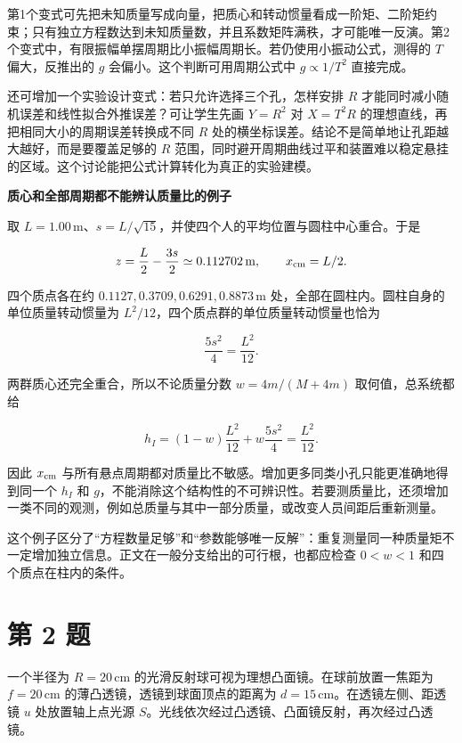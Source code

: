 \documentclass[12pt,a4paper,UTF8]{ctexart}
\begin{document}
第1个变式可先把未知质量写成向量，把质心和转动惯量看成一阶矩、二阶矩约束；只有独立方程数达到未知质量数，并且系数矩阵满秩，才可能唯一反演。第2个变式中，有限振幅单摆周期比小振幅周期长。若仍使用小振动公式，测得的
\(T\) 偏大，反推出的 \(g\) 会偏小。这个判断可用周期公式中
\(g\propto1/T^2\) 直接完成。

还可增加一个实验设计变式：若只允许选择三个孔，怎样安排 \(R\)
才能同时减小随机误差和线性拟合外推误差？可让学生先画 \(Y=R^2\) 对
\(X=T^2R\) 的理想直线，再把相同大小的周期误差转换成不同 \(R\)
处的横坐标误差。结论不是简单地让孔距越大越好，而是要覆盖足够的 \(R\)
范围，同时避开周期曲线过平和装置难以稳定悬挂的区域。这个讨论能把公式计算转化为真正的实验建模。

\textbf{质心和全部周期都不能辨认质量比的例子}

取
\(L=1.00\,\mathrm m\)、\(s=L/\sqrt{15}\)，并使四个人的平均位置与圆柱中心重合。于是

\[z=\frac L2-\frac{3s}{2}\simeq0.112702\,\mathrm m,\qquad x_{\rm cm}=L/2.\]

四个质点各在约 \(0.1127,0.3709,0.6291,0.8873\,\mathrm m\)
处，全部在圆柱内。圆柱自身的单位质量转动惯量为
\(L^2/12\)，四个质点群的单位质量转动惯量也恰为

\[\frac{5s^2}{4}=\frac{L^2}{12}.\]

两群质心还完全重合，所以不论质量分数 \(w=4m/(M+4m)\) 取何值，总系统都给

\[h_I=(1-w)\frac{L^2}{12}+w\frac{5s^2}{4}=\frac{L^2}{12}.\]

因此 \(x_{\rm cm}\)
与所有悬点周期都对质量比不敏感。增加更多同类小孔只能更准确地得到同一个
\(h_I\) 和
\(g\)，不能消除这个结构性的不可辨识性。若要测质量比，还须增加一类不同的观测，例如总质量与其中一部分质量，或改变人员间距后重新测量。

这个例子区分了``方程数量足够''和``参数能够唯一反解''：重复测量同一种质量矩不一定增加独立信息。正文在一般分支给出的可行根，也都应检查
\(0<w<1\) 和四个质点在柱内的条件。

\newpage

\section{第 2 题}\label{ux7b2c-2-ux9898}

一个半径为 \(R=20\,\mathrm{cm}\)
的光滑反射球可视为理想凸面镜。在球前放置一焦距为 \(f=20\,\mathrm{cm}\)
的薄凸透镜，透镜到球面顶点的距离为
\(d=15\,\mathrm{cm}\)。在透镜左侧、距透镜 \(u\) 处放置轴上点光源
\(S\)。光线依次经过凸透镜、凸面镜反射，再次经过凸透镜。
\end{document}
